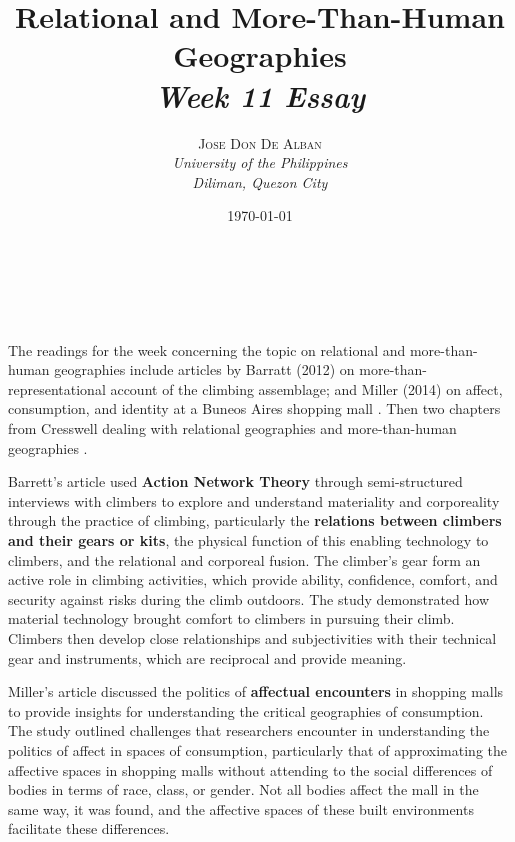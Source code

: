 \documentclass[a4paper, 10.5pt]{article} %
\title{\textbf{Relational and More-Than-Human Geographies}\\ %
\textsl{Week 11 Essay}} %
\author{\textsc{Jose Don De Alban} %
\\{\textit{University of the Philippines} %
\\{\textit{Diliman, Quezon City}}}} %
\date{\today} %
\makeatletter
\renewcommand{\maketitle}
{
\begin{flushright} %
{\LARGE\@title} %
\vspace{40pt} %

{\large\@author} %
\\\@date %

\vspace{10pt} %
\end{flushright}
}
\makeatother
\begin{document}
\maketitle %


\section*{}

The readings for the week concerning the topic on relational and more-than-human geographies include articles by Barratt (2012) \cite{barratt_2012} on more-than-representational account of the climbing assemblage; and Miller (2014) on affect, consumption, and identity at a Buneos Aires shopping mall \cite{miller_2014}. Then two chapters from Cresswell dealing with relational geographies \cite{cresswell_2013a} and more-than-human geographies \cite{cresswell_2013b}.

Barrett's article used \textbf{Action Network Theory} through semi-structured interviews with climbers to explore and understand materiality and corporeality through the practice of climbing, particularly the \textbf{relations between climbers and their gears or kits}, the physical function of this enabling technology to climbers, and the relational and corporeal fusion. The climber's gear form an active role in climbing activities, which provide ability, confidence, comfort, and security against risks during the climb outdoors. The study demonstrated how material technology brought comfort to climbers in pursuing their climb. Climbers then develop close relationships and subjectivities with their technical gear and instruments, which are reciprocal and provide meaning.

Miller's article discussed the politics of \textbf{affectual encounters} in shopping malls to provide insights for understanding the critical geographies of consumption. The study outlined challenges that researchers encounter in understanding the politics of affect in spaces of consumption, particularly that of approximating the affective spaces in shopping malls without attending to the social differences of bodies in terms of race, class, or gender. Not all bodies affect the mall in the same way, it was found, and the affective spaces of these built environments facilitate these differences.
\end{document}
